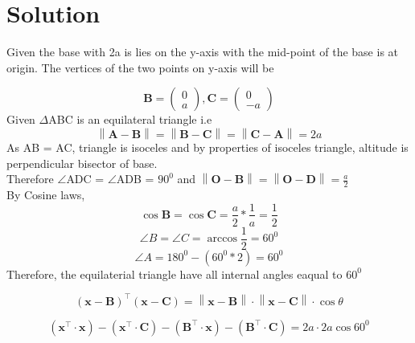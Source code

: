 \documentclass[journal,12pt,twocolumn]{IEEEtran}
\providecommand{\norm}[1]{\left\lVert#1\right\rVert}
\let\vec\mathbf
\providecommand{\brak}[1]{\ensuremath{\left(#1\right)}}
\begin{document}
\section{Solution}
\noindent Given the base with 2a is lies on the y-axis with the mid-point of the base is at origin. The vertices of the two points on y-axis will be

\begin{equation}
\vec{B}=\begin{pmatrix} 
0\\
a
\end{pmatrix}, {
\vec{C}=\begin{pmatrix} 
0\\
-a
\end{pmatrix} }
\end{equation}
\noindent Given $\Delta$ABC is an equilateral triangle i.e 
\begin{equation}
 \norm{\vec{A}-\vec{B}}= \norm{\vec{B}-\vec{C}}= \norm{\vec{C}-\vec{A}} =2a
\end{equation}
\noindent As AB = AC, triangle is isoceles and by properties of isoceles triangle, altitude is perpendicular bisector of base.\\

\noindent Therefore $\angle$ADC = $\angle$ADB = $90^0$ and $\norm{\vec{O}-\vec{B}}= \norm{\vec{O}-\vec{D}}= \frac{a}{2}$ \\

\noindent By Cosine laws,
\begin{equation}
\cos\vec{B} = \cos\vec{C} = \frac{a}{2} * \frac{1}{a} = \frac{1}{2}
\end{equation}
\begin{equation}
\angle B = \angle C = \arccos\frac{1}{2} = 60^0
\end{equation}
 \begin{equation}
 \angle A = 180^0 -(60^0 * 2) = 60^0
  \end{equation}
\noindent Therefore, the equilaterial triangle have all internal angles eaqual to  $60^0$ 

 \begin{equation}  
  \brak{\vec{x}-\vec{B}}^{\top} \brak{\vec{x}-\vec{C}}= \norm{\vec{x}-\vec{B}} \cdot \norm{\vec{x}-\vec{C}} \cdot \cos\theta 
 \end{equation}
 
 \begin{equation}  
\brak{\vec{x}^\top \cdot \vec{x}} - \brak{\vec{x}^\top \cdot \vec{C}} - \brak{\vec{B}^\top \cdot \vec{x}} - \brak{\vec{B}^\top \cdot \vec{C}} = 2a \cdot 2a \cos 60^0   
 \end{equation}
\end{document}
